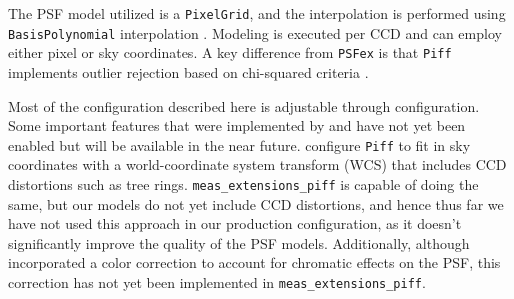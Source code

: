The PSF model utilized is a \texttt{PixelGrid}, and the interpolation is performed using \texttt{BasisPolynomial} interpolation \citep{2021MNRAS.501.1282J}.
Modeling is executed per CCD and can employ either pixel or sky coordinates.
A key difference from \texttt{PSFex} is that  \texttt{Piff} implements outlier rejection based on chi-squared criteria \citep[see][for more details]{2021MNRAS.501.1282J}.

Most of the configuration described here is adjustable through configuration.
Some important features that were implemented by \citet{2021MNRAS.501.1282J} and \citet{2025OJAp....8E..26S} have not yet been enabled but will be available in the near future.
\citet{2021MNRAS.501.1282J} configure \texttt{Piff} to fit in sky coordinates with a world-coordinate system transform (WCS) that includes CCD distortions such as tree rings.
\texttt{meas\_extensions\_piff} is capable of doing the same, but our models do not yet include CCD distortions, and hence thus far we have not used this approach in our production configuration, as it doesn't significantly improve the quality of the PSF models.
Additionally, although \citet{2025OJAp....8E..26S} incorporated a color correction to account for chromatic effects on the PSF, this correction has not yet been implemented in  \texttt{meas\_extensions\_piff}.
